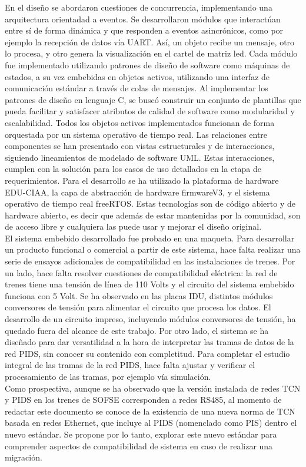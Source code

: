  En el diseño se abordaron cuestiones de concurrencia, implementando una arquitectura orientadad a eventos. Se desarrollaron módulos que interactúan entre sí de forma dinámica y que responden a eventos asincrónicos, como por ejemplo la recepción de datos vía UART. Así, un objeto recibe un mensaje, otro lo procesa, y otro genera la visualización en el cartel de matriz led. Cada módulo fue implementado utilizando patrones de diseño de software como máquinas de estados, a su vez embebidas en objetos activos, utilizando una interfaz de comunicación estándar a través de colas de mensajes.  Al implementar los patrones de diseño en lenguaje C, se buscó construir un conjunto de plantillas que pueda facilitar y satisfacer atributos de calidad de software como modularidad y escalabilidad. Todos los objetos activos implementados funcionan de forma orquestada por un sistema operativo de tiempo real. Las relaciones entre componentes se han presentado con vistas estructurales y de interacciones, siguiendo lineamientos de modelado de software UML. Estas interacciones, cumplen con la solución para los casos de uso detallados en la etapa de requerimientos. Para el desarrollo se ha utilizado la plataforma de hardware EDU-CIAA, la capa de abstracción de hardware firmwareV3, y el sistema operativo de tiempo real freeRTOS. Estas tecnologías son de código abierto y de hardware abierto, es decir que además de estar mantenidas por la comunidad, son de acceso libre y cualquiera las puede usar y mejorar el diseño original. \\


El sistema embebido desarrollado fue probado en una maqueta. Para desarrollar un producto funcional o comercial a partir de este sistema, hace falta realizar una serie de ensayos adicionales de compatibilidad en las instalaciones de trenes. Por un lado, hace falta resolver cuestiones de compatibilidad eléctrica: la red de trenes tiene una tensión de línea de 110 Volts y el circuito del sistema embebido funciona con 5 Volt. Se ha observado en las placas IDU, distintos módulos conversores de tensión para alimentar el circuito que procesa los datos. El desarrollo de un circuito impreso, incluyendo módulos conversores de tensión, ha quedado fuera del alcance de este trabajo. Por otro lado, el sistema se ha diseñado para dar versatilidad a la hora de interpretar las tramas de datos de la red PIDS, sin conocer su contenido con completitud. Para completar el estudio integral de las tramas de la red PIDS, hace falta ajustar y verificar el procesamiento de las tramas, por ejemplo vía simulación.\\


Como prospectiva, aunque se ha observado que la versión instalada de redes TCN y PIDS en los trenes de SOFSE corresponden a redes RS485, al momento de redactar este documento se conoce de la existencia de una nueva norma de TCN basada en redes Ethernet, que incluye al PIDS (nomenclado como PIS) dentro el nuevo estándar. Se propone por lo tanto, explorar este nuevo estándar para comprender aspectos de compatibilidad de sistema en caso de realizar una migración.\\